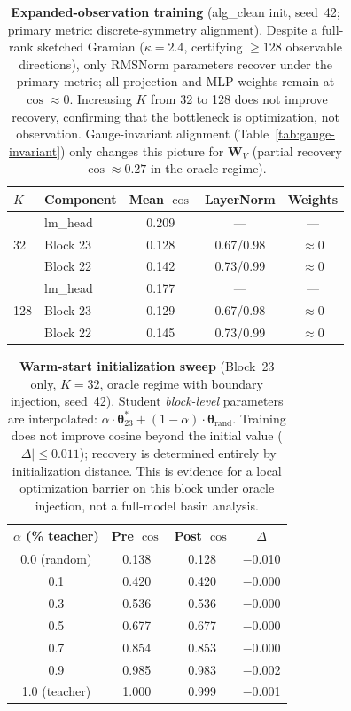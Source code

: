 \documentclass{article}
\newcommand{\btheta}{\boldsymbol{\theta}}
\newcommand{\bW}{\mathbf{W}}
\begin{document}
\begin{table}[t]
\centering
\caption{\textbf{Expanded-observation training} (alg\_clean init, seed~42; primary metric: discrete-symmetry alignment).  Despite a full-rank sketched Gramian ($\kappa{=}2.4$, certifying $\geq 128$ observable directions), only RMSNorm parameters recover under the primary metric; all projection and MLP weights remain at $\cos \approx 0$.  Increasing $K$ from 32 to 128 does not improve recovery, confirming that the bottleneck is optimization, not observation.  Gauge-invariant alignment (Table~\ref{tab:gauge-invariant}) only changes this picture for $\bW_V$ (partial recovery $\cos \approx 0.27$ in the oracle regime).}
\label{tab:expanded}
\small
\begin{tabular}{@{}l l ccc@{}}
\toprule
\textbf{$K$} & \textbf{Component} & \textbf{Mean $\cos$} & \textbf{LayerNorm} & \textbf{Weights} \\
\midrule
\multirow{3}{*}{32}
 & lm\_head  & 0.209 & --- & --- \\
 & Block 23  & 0.128 & 0.67/0.98 & $\approx 0$ \\
 & Block 22  & 0.142 & 0.73/0.99 & $\approx 0$ \\
\midrule
\multirow{3}{*}{128}
 & lm\_head  & 0.177 & --- & --- \\
 & Block 23  & 0.129 & 0.67/0.98 & $\approx 0$ \\
 & Block 22  & 0.145 & 0.73/0.99 & $\approx 0$ \\
\bottomrule
\end{tabular}
\end{table}

\begin{table}[t]
\centering
\caption{\textbf{Warm-start initialization sweep} (Block~23 only, $K{=}32$, oracle regime with boundary injection, seed~42).  Student \emph{block-level} parameters are interpolated: $\alpha \cdot \btheta^*_{23} + (1{-}\alpha) \cdot \btheta_{\text{rand}}$.  Training does not improve cosine beyond the initial value ($|\Delta| \leq 0.011$); recovery is determined entirely by initialization distance.  This is evidence for a local optimization barrier on this block under oracle injection, not a full-model basin analysis.}
\label{tab:warmstart}
\small
\begin{tabular}{@{}c ccc@{}}
\toprule
\textbf{$\alpha$ (\% teacher)} & \textbf{Pre $\cos$} & \textbf{Post $\cos$} & \textbf{$\Delta$} \\
\midrule
0.0 (random)  & 0.138 & 0.128 & $-$0.010 \\
0.1           & 0.420 & 0.420 & $-$0.000 \\
0.3           & 0.536 & 0.536 & $-$0.000 \\
0.5           & 0.677 & 0.677 & $-$0.000 \\
0.7           & 0.854 & 0.853 & $-$0.000 \\
0.9           & 0.985 & 0.983 & $-$0.002 \\
1.0 (teacher) & 1.000 & 0.999 & $-$0.001 \\
\bottomrule
\end{tabular}
\end{table}
\end{document}
